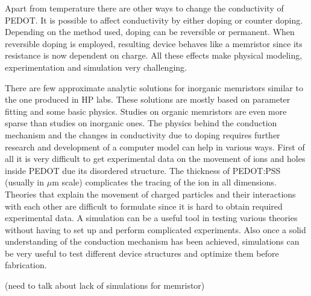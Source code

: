 Apart from temperature there are other ways to change the conductivity of PEDOT. It is possible to affect conductivity by either doping or counter doping. Depending on the method used, doping can be reversible or permanent. When reversible doping is employed, resulting device behaves like a memristor since its resistance is now dependent on charge. All these effects make physical modeling, experimentation and simulation very challenging. 

There are few approximate analytic solutions for inorganic memristors similar to the one produced in HP labs. These solutions are mostly based on parameter fitting and some basic physics. Studies on organic memristors are even more sparse than studies on inorganic ones. The physics behind the conduction mechanism and the changes in conductivity due to doping requires further research and development of a computer model can help in various ways. First of all it is very difficult to get experimental data on the movement of ions and holes inside PEDOT due its disordered structure. The thickness of PEDOT:PSS (usually in $\mu$m scale) complicates the tracing of the ion in all dimensions. Theories that explain the movement of charged particles and their interactions with each other are difficult to formulate since it is hard to obtain required experimental data. A simulation can be a useful tool in testing various theories without having to set up and perform complicated experiments. Also once a solid understanding of the conduction mechanism has been achieved, simulations can be very useful to test different device structures and optimize them before fabrication. 

(need to talk about lack of simulations for memristor)
 